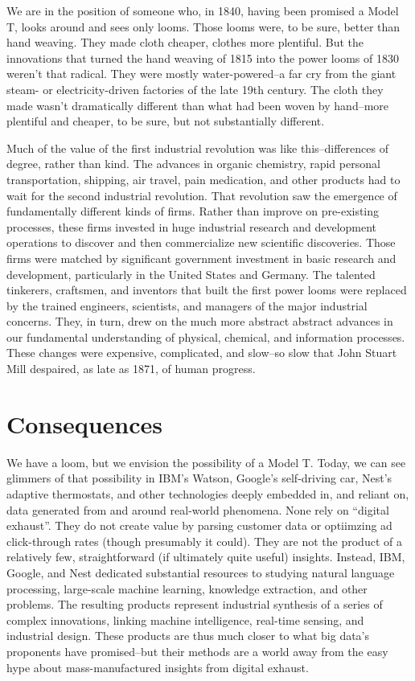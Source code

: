 \documentclass[12pt]{article}
\begin{document}
We are in the position of someone who, in 1840, having been promised a
Model T, looks around and sees only looms. Those looms were, to be
sure, better than hand weaving. They made cloth cheaper, clothes more
plentiful. But the innovations that turned the hand weaving of
1815 into the power looms of 1830 weren't that radical. They were
mostly water-powered--a far cry from the giant steam- or
electricity-driven factories of the late 19th century. The cloth they
made wasn't dramatically different than what had been woven by
hand--more plentiful and cheaper, to be sure, but not substantially
different.  

Much of the value of the first industrial revolution was like
this--differences of degree, rather than kind. The advances in organic
chemistry, rapid personal transportation, shipping, air travel, pain
medication, and other products had to wait for the second industrial
revolution. That revolution saw the emergence of fundamentally
different kinds of firms. Rather than improve on pre-existing
processes, these firms invested in huge industrial research and
development operations to discover and then commercialize new
scientific discoveries. Those firms were matched by significant
government investment in basic research and development, particularly
in the United States and Germany. The talented tinkerers, craftsmen,
and inventors that built the first power looms were replaced by the
trained engineers, scientists, and managers of the major industrial
concerns. They, in turn, drew on the much more abstract abstract
advances in our fundamental understanding of physical, chemical, and
information processes. These changes were expensive, complicated, and
slow--so slow that John Stuart Mill despaired, as late as 1871, of
human progress.


\section{Consequences}
\label{sec:consequences}

We have a loom, but we envision the possibility of a Model T. Today,
we can see glimmers of that possibility in IBM's Watson, Google's
self-driving car, Nest's adaptive thermostats, and other technologies
deeply embedded in, and reliant on, data generated from and around
real-world phenomena. None rely on ``digital exhaust''. They do not
create value by parsing customer data or optiimzing ad click-through
rates (though presumably it could). They are not the product of a
relatively few, straightforward (if ultimately quite useful)
insights. Instead, IBM, Google, and Nest dedicated substantial
resources to studying natural language processing, large-scale machine
learning, knowledge extraction, and other problems. The resulting
products represent industrial synthesis of a series of complex
innovations, linking machine intelligence, real-time sensing, and
industrial design. These products are thus much closer to what big
data's proponents have promised--but their methods are a world away
from the easy hype about mass-manufactured insights from digital exhaust.
\end{document}
